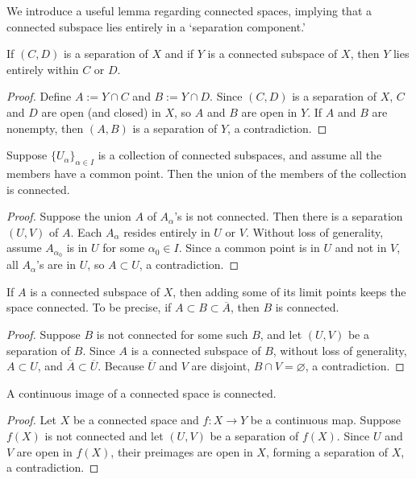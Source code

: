 We introduce a useful lemma regarding connected spaces, implying that a connected subspace lies entirely in a `separation component.'
\begin{lem}
    If $(C, D)$ is a separation of $X$ and if $Y$ is a connected subspace of $X$, then $Y$ lies entirely within $C$ or $D$.
\end{lem}
\begin{proof}
    Define $A:=Y\cap C$ and $B:=Y\cap D$.
    Since $(C, D)$ is a separation of $X$, $C$ and $D$ are open (and closed) in $X$, so $A$ and $B$ are open in $Y$.
    If $A$ and $B$ are nonempty, then $(A, B)$ is a separation of $Y$, a contradiction.
\end{proof}

\begin{prop}\label{nonempty intersection keeps connectedness}
    Suppose $\{U_\alpha\}_{\alpha\in I}$ is a collection of connected subspaces, and assume all the members have a common point.
    Then the union of the members of the collection is connected.
\end{prop}
\begin{proof}
    Suppose the union $A$ of $A_\alpha$'s is not connected.
    Then there is a separation $(U, V)$ of $A$.
    Each $A_\alpha$ resides entirely in $U$ or $V$.
    Without loss of generality, assume $A_{\alpha_0}$ is in $U$ for some $\alpha_0\in I$.
    Since a common point is in $U$ and not in $V$, all $A_\alpha$'s are in $U$, so $A\subset U$, a contradiction.
\end{proof}

\begin{prop}\label{adding limit points keeps connectedness}
    If $A$ is a connected subspace of $X$, then adding some of its limit points keeps the space connected.
    To be precise, if $A\subset B\subset\overline{A}$, then $B$ is connected.
\end{prop}
\begin{proof}
    Suppose $B$ is not connected for some such $B$, and let $(U, V)$ be a separation of $B$.
    Since $A$ is a connected subspace of $B$, without loss of generality, $A\subset U$, and $\overline{A}\subset \overline{U}$.
    Because $\overline{U}$ and $V$ are disjoint, $B\cap V=\varnothing$, a contradiction.
\end{proof}

\begin{prop}\label{continuity keeps connectedness}
    A continuous image of a connected space is connected.
\end{prop}
\begin{proof}
    Let $X$ be a connected space and $f: X\rightarrow Y$ be a continuous map.
    Suppose $f(X)$ is not connected and let $(U, V)$ be a separation of $f(X)$.
    Since $U$ and $V$ are open in $f(X)$, their preimages are open in $X$, forming a separation of $X$, a contradiction.
\end{proof}

